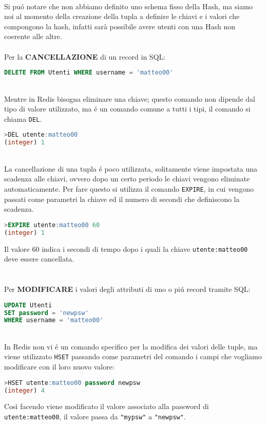 \\
Si puó notare che non abbiamo definito uno schema fisso della Hash, ma siamo noi al momento della creazione della tupla a definire le chiavi e i valori che compongono la hash,
infatti sarà possibile avere utenti con una Hash non coerente alle altre.\\
\\
Per la \textbf{CANCELLAZIONE} di un record in SQL:
\begin{lstlisting}[autogobble, style=redis-cli, language=SQL]
DELETE FROM Utenti WHERE username = 'matteo00'\end{lstlisting}
\\
Mentre in Redis bisogna eliminare una chiave; questo comando non dipende dal tipo di valore utilizzato, ma é un comando comune
a tutti i tipi, il comando si chiama \texttt{DEL}.

\begin{lstlisting}[autogobble, style=redis-cli, language=SQL]
>DEL utente:matteo00
(integer) 1\end{lstlisting}
\\
La cancellazione di una tupla é poco utilizzata, solitamente viene impostata una scadenza alle chiavi, ovvero dopo un certo periodo le chiavi vengono eliminate automaticamente.
Per fare questo si utilizza il comando \texttt{EXPIRE}, in cui vengono passati come parametri la chiave ed il numero di secondi che definiscono la scadenza.
\begin{lstlisting}[autogobble, style=redis-cli, language=SQL]
>EXPIRE utente:matteo00 60
(integer) 1\end{lstlisting}
Il valore 60 indica i secondi di tempo dopo i quali la chiave \texttt{utente:matteo00} deve essere cancellata.\\
 \\
\\
Per \textbf{MODIFICARE} i valori degli attributi di uno o piú record tramite SQL:
\begin{lstlisting}[autogobble, style=redis-cli, language=SQL]
UPDATE Utenti
SET password = 'newpsw'
WHERE username = 'matteo00'\end{lstlisting}
\\
In Redis non vi é un comando specifico per la modifica dei valori delle tuple, ma viene utilizzato \texttt{HSET} passando come parametri del comando
i campi che vogliamo modificare con il loro nuovo valore:
\begin{lstlisting}[autogobble, style=redis-cli, language=SQL]
>HSET utente:matteo00 password newpsw
(integer) 4\end{lstlisting}
Così facendo viene modificato il valore associato alla password di \texttt{utente:matteo00}, il valore passa da \texttt{"mypsw"} a \texttt{"newpsw"}.

